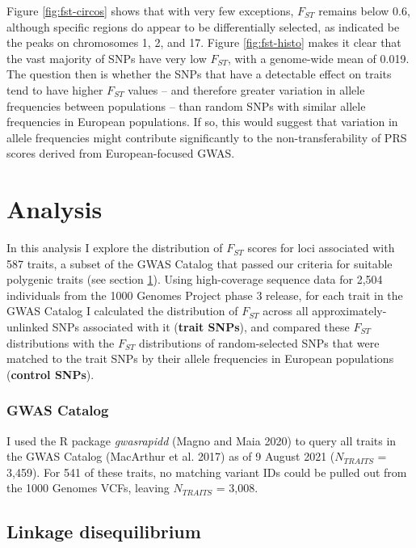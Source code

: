 \documentclass[
]{book}
\begin{document}
Figure \ref{fig:fst-circos} shows that with very few exceptions, \(F_{ST}\) remains below 0.6, although specific regions do appear to be differentially selected, as indicated be the peaks on chromosomes 1, 2, and 17. Figure \ref{fig:fst-histo} makes it clear that the vast majority of SNPs have very low \(F_{ST}\), with a genome-wide mean of 0.019. The question then is whether the SNPs that have a detectable effect on traits tend to have higher \(F_{ST}\) values -- and therefore greater variation in allele frequencies between populations -- than random SNPs with similar allele frequencies in European populations. If so, this would suggest that variation in allele frequencies might contribute significantly to the non-transferability of PRS scores derived from European-focused GWAS.

\hypertarget{Fst-analysis-chap}{%
\section{Analysis}\label{Fst-analysis-chap}}

In this analysis I explore the distribution of \(F_{ST}\) scores for loci associated with 587 traits, a subset of the GWAS Catalog that passed our criteria for suitable polygenic traits (see section \ref{Fst-analysis-chap}). Using high-coverage sequence data for 2,504 individuals from the 1000 Genomes Project phase 3 release, for each trait in the GWAS Catalog I calculated the distribution of \(F_{ST}\) across all approximately-unlinked SNPs associated with it (\textbf{trait SNPs}), and compared these \(F_{ST}\) distributions with the \(F_{ST}\) distributions of random-selected SNPs that were matched to the trait SNPs by their allele frequencies in European populations (\textbf{control SNPs}).

\hypertarget{gwas-catalog}{%
\subsubsection{GWAS Catalog}\label{gwas-catalog}}

I used the R package \emph{gwasrapidd} (Magno and Maia 2020) to query all traits in the GWAS Catalog (MacArthur et al. 2017) as of 9 August 2021 (\(N_{TRAITS}\) = 3,459). For 541 of these traits, no matching variant IDs could be pulled out from the 1000 Genomes VCFs, leaving \(N_{TRAITS}\) = 3,008.

\hypertarget{linkage-disequilibrium}{%
\subsection{Linkage disequilibrium}\label{linkage-disequilibrium}}
\end{document}
